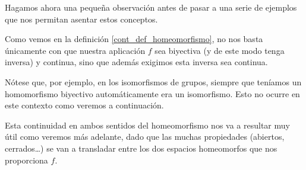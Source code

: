 Hagamos ahora una pequeña observación antes de pasar a una serie de ejemplos que nos permitan asentar estos conceptos.

\begin{obs}
	\label{cont_obs_defHomeomorfismo}
	Como vemos en la definición \ref{cont_def_homeomorfismo}, no nos basta únicamente con que nuestra aplicación $f$ sea biyectiva (y de este modo tenga inversa) y continua, sino que además exigimos esta inversa sea continua. 
	
	Nótese que, por ejemplo, en los isomorfismos de grupos, siempre que teníamos un homomorfismo biyectivo automáticamente era un isomorfismo. Esto no ocurre en este contexto como veremos a continuación.
	
	Esta continuidad en ambos sentidos del homeomorfismo nos va a resultar muy útil como veremos más adelante, dado que las muchas propiedades (abiertos, cerrados\dots) se van a transladar entre los dos espacios homeomorfos que nos proporciona $f$.
\end{obs}

